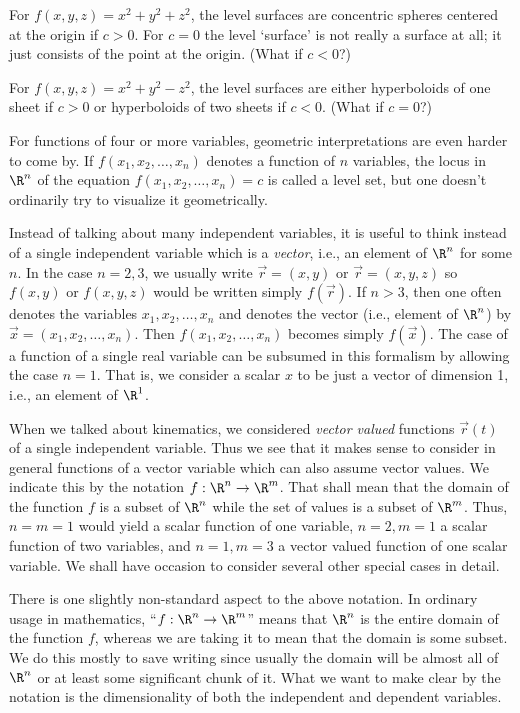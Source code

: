 \begin{example}
For $f(x, y, z) = x^2 + y^2 + z^2$, the level surfaces are
concentric spheres centered at the origin if $c > 0$.   For
$c = 0$ the level `surface' is not really a surface at all; it
just consists of the point at the origin.   (What if $c < 0$?) 

For $f(x,y,z) = x^2 + y^2 - z^2$, the level surfaces are either
hyperboloids of one sheet if $c > 0$ or hyperboloids of two sheets
if $c < 0$.  (What if $c = 0$?)
\end{example}

For functions of four or more variables, geometric interpretations
are even harder to come by.  If $f(x_1,x_2,\dots,x_n)$ denotes
a function of $n$ variables, the locus in $\R^n$  of the
equation $f(x_1,x_2,\dots,x_n) = c$ is called a level set,
but one doesn't ordinarily try to visualize it geometrically.  

Instead of talking about many independent variables, it is useful
to think instead of a single independent variable which is a 
\emph{vector}, i.e., an element of $\R^n$ for some $n$.   In the
case  $n = 2, 3$, we usually write $\vec r = ( x,y )$ or
$\vec r = ( x,y,z )$ so $f(x,y)$ or $f(x,y,z)$ would be written 
simply $f(\vec r)$.  If $n > 3$, then one often denotes the
variables $x_1, x_2, \dots, x_n$ and denotes the vector
(i.e., element of $\R^n$) by $\vec x = (x_1,x_2, \dots, x_n)$.
Then $f(x_1,x_2, \dots, x_n)$ becomes simply  $f(\vec x)$.
The case of a function of a single real variable can be subsumed
in this formalism by allowing the case $n =1$.  That is,
we consider a scalar $x$ to be just a vector of dimension 1,
i.e., an element of $\R^1$.

When we talked about kinematics, we considered  \emph{vector valued}
functions $\vec r(t)$ of a single independent variable.    Thus we see
that it makes sense to consider in general functions of a vector
variable which can also assume vector values.   We indicate this
by the notation $f:\R^n \to \R^m$.   That shall mean that the domain
of the function $f$ is a subset of $\R^n$ while the set of values is
a subset of $\R^m$.    Thus, $n = m = 1$ would yield a scalar
function of one variable, $n = 2, m = 1$ a scalar function of two
variables, and $n = 1, m = 3$ a vector valued function of one scalar
variable.   We shall have occasion to consider several other special
cases in detail.

There is one slightly non-standard aspect to the above notation.
In ordinary usage in mathematics,
``$f:\R^n \to \R^m$'' means that $\R^n$ is the entire domain of the
function $f$, whereas we are taking it to mean that the domain is some
subset.    We do this mostly to save writing since usually the
domain will be almost all of $\R^n$  or at least some significant
chunk of it.  What we want to make clear by the notation is the
dimensionality of both the independent and dependent variables.

